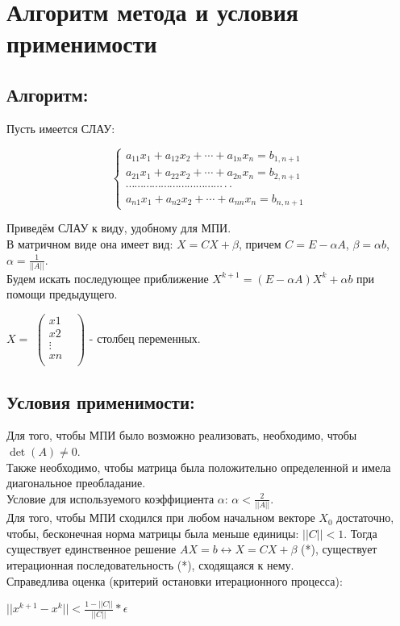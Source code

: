 \documentclass[12pt]{article}
\begin{document}
\section{Алгоритм метода и условия применимости}

\subsection{Алгоритм:}
Пусть имеется СЛАУ:
\begin{center}
\begin{equation*}
 \begin{cases}
   a_{11}x_1 +a_{12}x_2 + \cdots + a_{1n}x_n = b_{1,n+1} 
   \\
   a_{21}x_1 +a_{22}x_2 + \cdots + a_{2n}x_n = b_{2,n+1}
   \\
   \cdots \cdots \cdots \cdots \cdots \cdots \cdots \cdots \cdots \cdots \cdots \cdot \cdot
   \\
    a_{n1}x_1 +a_{n2}x_2 + \cdots + a_{nn}x_n = b_{n,n+1}
   
 \end{cases}
\end{equation*}
\end{center}
Приведём СЛАУ к виду, удобному для МПИ.\\ В матричном виде она имеет вид: $X = CX + \beta$, причем $C = E-\alpha A$, $\beta = \alpha b$, $\alpha = \frac{1}{||A||}$. \\
Будем искать последующее приближение $X^{k+1} = (E-\alpha A) X^{k} + \alpha b$ при помощи предыдущего.\\
\begin{center}
$X=$
$\begin{pmatrix}
x1& \\
x2& \\
\vdots\\
xn&  \\
\end{pmatrix}$ - столбец переменных.
\end{center}

\subsection{Условия применимости:}
Для того, чтобы МПИ было возможно реализовать, необходимо, чтобы $\det(A) \ne 0$.\\
Также необходимо, чтобы матрица была положительно определенной и имела диагональное преобладание.\\
Условие для используемого коэффициента $\alpha$: $\alpha < \frac{2}{||A||}$. \\
Для того, чтобы МПИ сходился при любом начальном векторе $X_{0}$ достаточно, чтобы, бесконечная норма матрицы была меньше единицы: $||C||< 1$. Тогда существует единственное решение $AX=b \leftrightarrow X = CX + \beta $ (*), существует итерационная последовательность (*), сходящаяся к нему. \\
Справедлива оценка (критерий остановки итерационного процесса): \\
\begin{center}
    $||x^{k+1}-x^{k}||<\frac{1-||C||}{||C||}*\epsilon$\\
\end{center}
\end{document}
